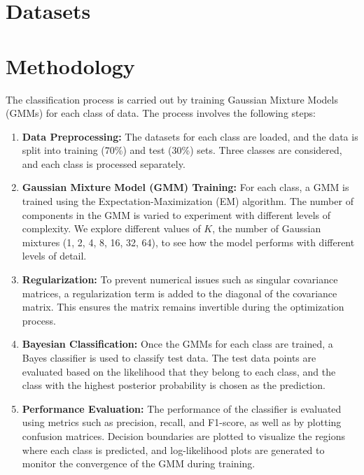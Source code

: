 \documentclass[conference]{IEEEtran}
\begin{document}
	\section{Datasets}
	
	
	\section{Methodology}
	The classification process is carried out by training Gaussian Mixture Models (GMMs) for each class of data. The process involves the following steps:
	
	\begin{enumerate}
		\item \textbf{Data Preprocessing:} The datasets for each class are loaded, and the data is split into training (70\%) and test (30\%) sets. Three classes are considered, and each class is processed separately.
		
		\item \textbf{Gaussian Mixture Model (GMM) Training:} For each class, a GMM is trained using the Expectation-Maximization (EM) algorithm. The number of components in the GMM is varied to experiment with different levels of complexity. We explore different values of \( K \), the number of Gaussian mixtures (1, 2, 4, 8, 16, 32, 64), to see how the model performs with different levels of detail.
		
		\item \textbf{Regularization:} To prevent numerical issues such as singular covariance matrices, a regularization term is added to the diagonal of the covariance matrix. This ensures the matrix remains invertible during the optimization process.
		
		\item \textbf{Bayesian Classification:} Once the GMMs for each class are trained, a Bayes classifier is used to classify test data. The test data points are evaluated based on the likelihood that they belong to each class, and the class with the highest posterior probability is chosen as the prediction.
		
		\item \textbf{Performance Evaluation:} The performance of the classifier is evaluated using metrics such as precision, recall, and F1-score, as well as by plotting confusion matrices. Decision boundaries are plotted to visualize the regions where each class is predicted, and log-likelihood plots are generated to monitor the convergence of the GMM during training.
	\end{enumerate}
	
\end{document}
